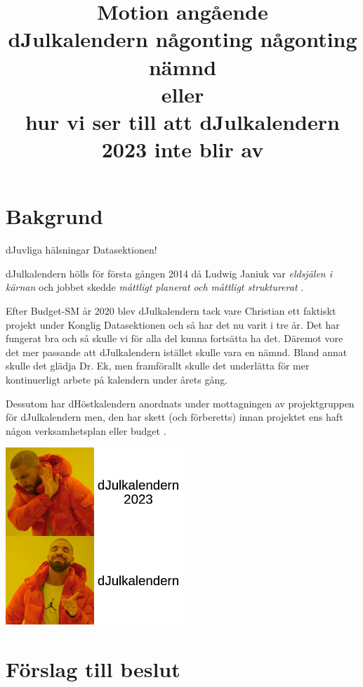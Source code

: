 \documentclass[a4paper]{article}
\title{\textcolor{cerise}{\textbf{
    Motion angående\\
    dJulkalendern någonting någonting nämnd\\
    eller\\
    hur vi ser till att dJulkalendern 2023 inte blir av
}}}
\date{}
\begin{document}
\maketitle
\thispagestyle{fancy} %

\section*{\textcolor{cerise}{
    Bakgrund
}}

dJuvliga hälsningar Datasektionen!

dJulkalendern hölls för första gången 2014 \cite{lol} då Ludwig Janiuk var \textit{eldsjälen i
kärnan} och jobbet skedde \textit{måttligt planerat och måttligt strukturerat}
\cite{weigelt_20}.

Efter Budget-SM år 2020 blev dJulkalendern tack vare Christian ett faktiskt projekt under Konglig
Datasektionen och så har det nu varit i tre år. Det har fungerat bra och så skulle vi för alla del
kunna fortsätta ha det. Däremot vore det mer passande att dJulkalendern istället skulle vara en
nämnd. Bland annat skulle det glädja Dr. Ek, men framförallt skulle det underlätta för mer
kontinuerligt arbete på kalendern under årets gång.

Dessutom har dHöstkalendern anordnats under mottagningen av projektgruppen för dJulkalendern men,
den har skett (och förberetts) innan projektet ens haft någon verksamhetsplan eller budget
\cite{kaffe_dm_22}.

\vspace{1cm}

\begin{center}
    \includegraphics[width=0.5\textwidth]{./djulutan23.jpg}
\end{center}

\clearpage

\section*{\textcolor{cerise}{
    Förslag till beslut
}}
\end{document}
